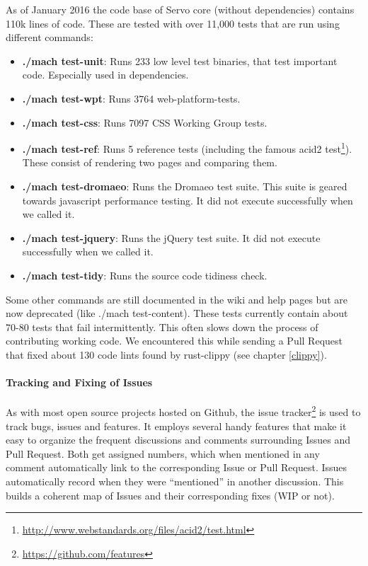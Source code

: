 \documentclass{scrartcl}
\begin{document}
As of January 2016 the code base of Servo core (without dependencies) contains 110k lines of code. These are tested with over 11,000 tests that are run using different commands:
\begin{itemize}
    \item \textbf{./mach test-unit}: Runs 233 low level test binaries, that test important code. Especially used in dependencies.
    \item \textbf{./mach test-wpt}: Runs 3764 web-platform-tests. 
    \item \textbf{./mach test-css}: Runs 7097 CSS Working Group tests.
    \item \textbf{./mach test-ref}: Runs 5 reference tests (including the famous acid2 test\footnote{\url{http://www.webstandards.org/files/acid2/test.html}}). These consist of rendering two pages and comparing them.
    \item \textbf{./mach test-dromaeo}: Runs the Dromaeo test suite. This suite is geared towards javascript performance testing. It did not execute successfully when we called it.
    \item \textbf{./mach test-jquery}: Runs the jQuery test suite. It did not execute successfully when we called it.
    \item \textbf{./mach test-tidy}: Runs the source code tidiness check.
\end{itemize}

Some other commands are still documented in the wiki and help pages but are now deprecated (like ./mach test-content). These tests currently contain about 70-80 tests that fail intermittently. This often slows down the process of contributing working code. We encountered this while sending a Pull Request that fixed about 130 code lints found by rust-clippy (see chapter \ref{clippy}).

\paragraph{Tracking and Fixing of Issues}
As with most open source projects hosted on Github, the issue tracker\footnote{\url{https://github.com/features}} is used to track bugs, issues and features. It employs several handy features that make it easy to organize the frequent discussions and comments surrounding Issues and Pull Request. Both get assigned numbers, which when mentioned in any comment automatically link to the corresponding Issue or Pull Request. Issues automatically record when they were ``mentioned'' in another discussion. This builds a coherent map of Issues and their corresponding fixes (WIP or not).
\end{document}
